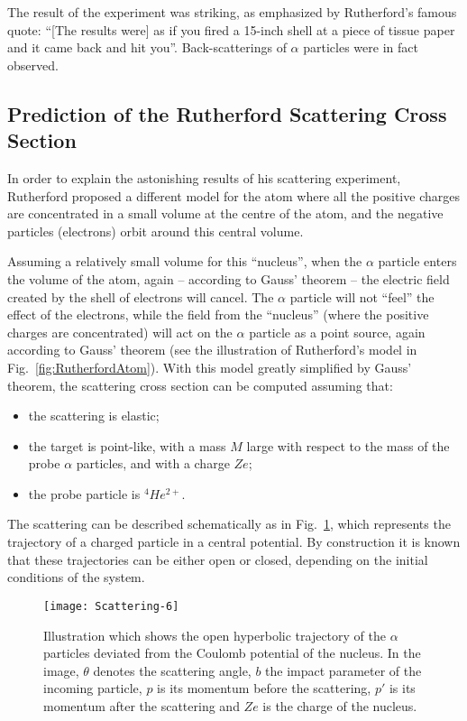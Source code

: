 The result of the experiment was striking, as emphasized by Rutherford's famous quote: ``[The results were] as if you fired a 15-inch shell at a piece of tissue paper and it came back and hit you''. Back-scatterings of $\alpha$ particles were in fact observed.

\subsection{Prediction of the Rutherford Scattering Cross Section}
In order to explain the astonishing results of his scattering experiment, Rutherford proposed a different model for the atom where all the positive charges are concentrated in a small volume at the centre of the atom, and the negative particles (electrons) orbit around this central volume.

Assuming a relatively small volume for this ``nucleus'', when the $\alpha$ particle enters the volume of the atom, again -- according to Gauss' theorem -- the electric field created by the shell of electrons will cancel. The $\alpha$ particle will not ``feel'' the effect of the electrons, while the field from the ``nucleus'' (where the positive charges are concentrated) will act on the $\alpha$ particle as a point source, again according to Gauss' theorem (see the illustration of Rutherford's model in Fig.~\ref{fig:RutherfordAtom}).   
With this model greatly simplified by Gauss' theorem, the scattering cross section can be computed assuming that:
\begin{itemize}
    \item the scattering is elastic;
    \item the target is point-like, with a mass $M$ large with respect to the mass of the probe $\alpha$ particles, and with a charge $Ze$;
    \item the probe particle is $^4 He^{2+}$.
\end{itemize}
The scattering can be described schematically as in Fig.~\ref{fig:RutherfordScattering}, which represents the trajectory of a charged particle in a central potential. By construction it is known that these trajectories can be either open or closed, depending on the initial conditions of the system.

\begin{figure}
    \centering
    \texttt{[image: Scattering-6]}
    \caption{Illustration which shows the open hyperbolic trajectory of the $\alpha$ particles deviated from the Coulomb potential of the nucleus.
    In the image, $\theta$ denotes the scattering angle, $b$ the impact parameter of the incoming particle, $p$ is its momentum before the scattering, $p'$ is its momentum after the scattering and $Ze$ is the charge of the nucleus.}
    \label{fig:RutherfordScattering}
\end{figure}{}

